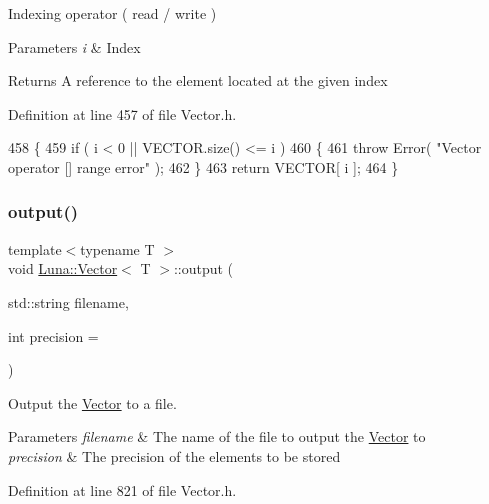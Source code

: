 Indexing operator ( read / write ) 


\begin{DoxyParams}{Parameters}
{\em i} & Index \\
\hline
\end{DoxyParams}
\begin{DoxyReturn}{Returns}
A reference to the element located at the given index 
\end{DoxyReturn}


Definition at line 457 of file Vector.\+h.


\begin{DoxyCode}
458   \{
459     \textcolor{keywordflow}{if} ( i < 0 || VECTOR.size() <= i )
460     \{
461       \textcolor{keywordflow}{throw} Error( \textcolor{stringliteral}{"Vector operator [] range error"} );
462     \}
463     \textcolor{keywordflow}{return} VECTOR[ i ];
464   \}
\end{DoxyCode}
\mbox{\label{classLuna_1_1Vector_aac601f8185b989cc0865fdc0c86483ca}} 
\subsubsection{\texorpdfstring{output()}{output()}}
{\footnotesize\ttfamily template$<$typename T $>$ \\
void \hyperlink{classLuna_1_1Vector}{Luna\+::\+Vector}$<$ T $>$\+::output (\begin{DoxyParamCaption}\item[{std\+::string}]{filename,  }\item[{int}]{precision = {} }\end{DoxyParamCaption})\hspace{0.3cm}{\ttfamily [inline]}}



Output the \hyperlink{classLuna_1_1Vector}{Vector} to a file. 


\begin{DoxyParams}{Parameters}
{\em filename} & The name of the file to output the \hyperlink{classLuna_1_1Vector}{Vector} to \\
\hline
{\em precision} & The precision of the elements to be stored \\
\hline
\end{DoxyParams}


Definition at line 821 of file Vector.\+h.


